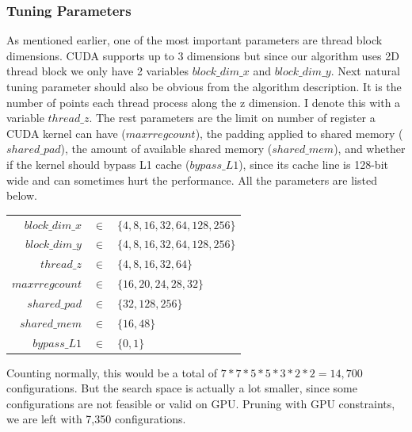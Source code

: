 \subsubsection{Tuning Parameters}
As mentioned earlier, one of the most important parameters are thread block dimensions. CUDA supports up to 3 dimensions but since our algorithm uses 2D thread block we only have 2 variables $block\_dim\_x$ and $block\_dim\_y$. Next natural tuning parameter should also be obvious from the algorithm description. It is the number of points each thread process along the z dimension. I denote this with a variable $thread\_z$. The rest parameters are the limit on number of register a CUDA kernel can have ($maxrregcount$), the padding applied to shared memory ($shared\_pad$), the amount of available shared memory ($shared\_mem$), and whether if the kernel should bypass L1 cache ($bypass\_L1$), since its cache line is 128-bit wide and can sometimes hurt the performance. All the parameters are listed below.

\begin{table}[h]
\center
\begin{tabular}{r c l}
$block\_dim\_x$ & $\in$ & $\{4, 8, 16, 32, 64, 128,256\}$	\\
$block\_dim\_y$ & $\in$ & $\{4, 8, 16, 32, 64, 128,256\}$	\\
$thread\_z$     & $\in$ & $\{4, 8, 16, 32, 64\}$			\\
$maxrregcount$  & $\in$ & $\{16, 20, 24, 28, 32\}$			\\
$shared\_pad$   & $\in$ & $\{32, 128, 256\}$				\\
$shared\_mem$   & $\in$ & $\{16, 48\}$						\\
$bypass\_L1$    & $\in$ & $\{0, 1\}$						\\
\end{tabular}
\end{table}

Counting normally, this would be a total of $7*7*5*5*3*2*2=14,700$ configurations. But the search space is actually a lot smaller, since some configurations are not feasible or valid on GPU. Pruning with GPU constraints, we are left with 7,350 configurations.

